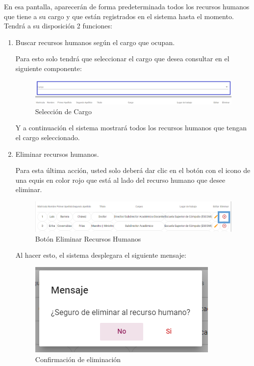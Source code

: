         En esa pantalla, aparecerán de forma predeterminada todos los recursos humanos que tiene a su cargo y que están registrados en el sistema hasta el momento. Tendrá a su disposición 2 funciones:
        \newpage
        \begin{enumerate}

            \item   Buscar recursos humanos según el cargo que ocupan.

                Para esto solo tendrá que seleccionar el cargo que desea consultar en el siguiente componente:

                \begin{figure}[H]
                    \centering
                    \hypertarget{cargo1}{\includegraphics[width=0.7\linewidth]{images/SP1/BtnCargo1}}
                    \caption{Selección de Cargo}
                    \label{cargo1}
                \end{figure}

                 Y a continuación el sistema mostrará todos los recursos humanos que tengan el cargo seleccionado.

                    \item Eliminar recursos humanos.

                Para esta última acción, usted solo deberá dar clic en el botón con el icono de una equis en color rojo que está al lado del recurso humano que desee  eliminar.

                \begin{figure}[H]
                    \centering
                    \hypertarget{eliminar}{\includegraphics[width=0.7\linewidth]{images/SP1/BtnEliminar}}
                    \caption{Botón Eliminar Recursos Humanos}
                    \label{eliminar}
                \end{figure}

                Al hacer esto, el sistema desplegara el siguiente mensaje:

               \begin{figure}[H]
                    \centering
                    \includegraphics[width=0.4\linewidth]{images/SP1/MSG22}
                \caption{Confirmación de eliminación}
                \label{confirmarE}


\end{figure}
\end{enumerate}
